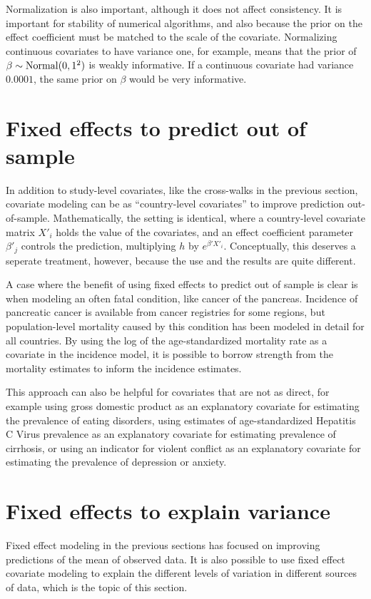 Normalization is also important, although it does not affect
consistency.  It is important for stability of numerical algorithms,
and also because the prior on the effect coefficient must be matched
to the scale of the covariate.  Normalizing continuous covariates to
have variance one, for example, means that the prior of
$\beta\sim\operatorname{Normal}(0,1^2)$ is weakly informative.  If a continuous
covariate had variance $0.0001$, the same prior on $\beta$ would be
very informative.

\section{Fixed effects to predict out of sample}

In addition to study-level covariates, like the cross-walks in the
previous section, covariate modeling can be as ``country-level
covariates'' to improve prediction out-of-sample.  Mathematically, the
setting is identical, where a country-level covariate matrix $X'_i$ holds
the value of the covariates, and an effect coefficient parameter
$\beta'_j$ controls the prediction, multiplying $h$ by
$e^{\beta' X'_i}$.  Conceptually, this deserves a seperate treatment,
  however, because the use and the results are quite different.

A case where the benefit of using fixed effects to predict out of
sample is clear is when modeling an often fatal condition, like cancer
of the pancreas.  Incidence of pancreatic cancer is available from
cancer registries for some regions, but population-level mortality
caused by this condition has been modeled in detail for all
countries.  By using the log of the age-standardized mortality rate as a
covariate in the incidence model, it is possible to borrow strength
from the mortality estimates to inform the incidence estimates.

This approach can also be helpful for covariates that are not as
direct, for example using gross domestic product as an explanatory
covariate for estimating the prevalence of eating disorders, using
estimates of age-standardized Hepatitis C Virus prevalence as an
explanatory covariate for estimating prevalence of cirrhosis, or using
an indicator for violent conflict as an explanatory covariate for
estimating the prevalence of depression or anxiety.



\section{Fixed effects to explain variance}
Fixed effect modeling in the previous sections has focused on
improving predictions of the mean of observed data.  It is also
possible to use fixed effect covariate modeling to explain the
different levels of variation in different sources of data, which is
the topic of this section.

